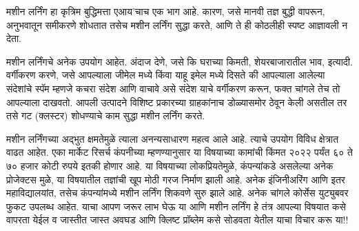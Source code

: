 मशीन लर्निंग हा कृत्रिम बुद्धिमत्ता  एआय'चाच एक भाग आहे. कारण, जसे मानवी तज्ञ बुद्धी वापरून, अनुभवातून समीकरणे शोधतात तसेच मशीन लर्निंग सुद्धा करते, आणि ते ही कोठलीही स्पष्ट आज्ञावली न देता.

मशीन लर्निंगचे अनेक उपयोग आहेत. अंदाज देणे, जसे कि घराच्या किमती, शेयरबाजारातील भाव, इत्यादी. वर्गीकरण करणे, जसे आपल्याला जीमेल मध्ये किंवा याहू इमेल मध्ये दिसते की आपल्याला आलेल्या संदेशांचे स्पॅम म्हणजे कचरा संदेश आणि वाचावे असे संदेश याचे वर्गीकरण करून, फक्त चांगले तेच तो आपल्याला दाखवतो. आपली उत्पादने विशिष्ट प्रकारच्या ग्राहकांनाच डोळ्यासमोर ठेवून केली असतील तर तसे गट (क्लस्टर) शोधण्याचे काम सुद्धा मशीन लर्निंग करते.

मशीन लर्निंगच्या अद्भुत क्षमतेमुळे त्याला अनन्यसाधारण महत्व आले आहे. त्याचे उपयोग विविध क्षेत्रात वाढत आहेत. एका मार्केट रिसर्च कंपनीच्या म्हणण्यानुसार या विषयाच्या कामांची किंमत २०२२ पर्यंत ६० ते ७० हजार कोटी रुपये इतकी होणार आहे. या विषयाच्या लोकप्रियतेमुळे, कंपन्यांकडे असलेल्या अनेक प्रोजेक्टस मुळे, या विषयातील तज्ञांची खूप मोठी गरज निर्माण झाली आहे. अनेक इंजिनीअरिंग आणि इतर महाविद्यालयांत, तसेच कंपन्यांमध्ये मशीन लर्निंग शिकवणे सुरु झाले आहे. अनेक चांगले कोर्सेस युट्युबवर फुकट उपलब्ध आहेत. याचा आपण जरूर लाभ घेऊ या आणि मशीन लर्निंग हे तंत्र आपल्या विषयात कसे वापरता येईल व जास्तीत जास्त अवघड आणि क्लिष्ट प्रॉब्लेम कसे सोडवता येतील याचा विचार करू या!!